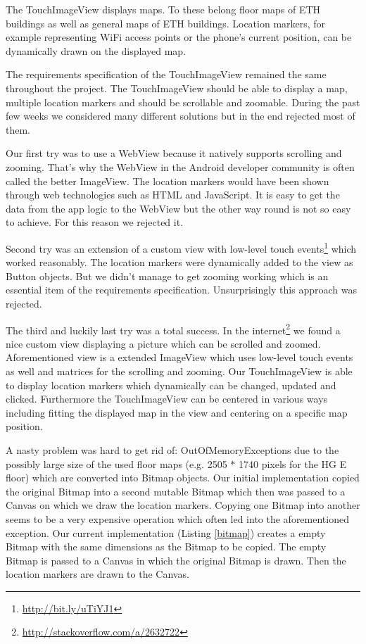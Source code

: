 The TouchImageView displays maps. To these belong floor maps of ETH buildings as well as general maps of ETH buildings. Location markers, for example representing WiFi access points or the phone's current position, can be dynamically drawn on the displayed map.

The requirements specification of the TouchImageView remained the same throughout the project. The TouchImageView should be able to display a map, multiple location markers and should be scrollable and zoomable. During the past few weeks we considered many different solutions but in the end rejected most of them.

Our first try was to use a WebView because it natively supports scrolling and zooming. That's why the WebView in the Android developer community is often called the better ImageView. The location markers would have been shown through web technologies such as HTML and JavaScript. It is easy to get the data from the app logic to the WebView but the other way round is not so easy to achieve. For this reason we rejected it. 

Second try was an extension of a custom view with low-level touch events\footnote{\url{http://bit.ly/uTiYJ1}} which worked reasonably. The location markers were dynamically added to the view as Button objects. But we didn't manage to get zooming working which is an essential item of the requirements specification. Unsurprisingly this approach was rejected.

The third and luckily last try was a total success. In the internet\footnote{\url{http://stackoverflow.com/a/2632722}} we found a nice custom view displaying a picture which can be scrolled and zoomed. Aforementioned view is a extended ImageView which uses low-level touch events as well and matrices for the scrolling and zooming. Our TouchImageView is able to display location markers which dynamically can be changed, updated and clicked. Furthermore the TouchImageView can be centered in various ways including fitting the displayed map in the view and centering on a specific map position.

A nasty problem was hard to get rid of: OutOfMemoryExceptions due to the possibly large size of the used floor maps (e.g. 2505 $*$ 1740 pixels for the HG E floor) which are converted into Bitmap objects. Our initial implementation copied the original Bitmap into a second mutable Bitmap which then was passed to a Canvas on which we draw the location markers. Copying one Bitmap into another seems to be a very expensive operation which often led into the aforementioned exception. Our current implementation (Listing \ref{bitmap}) creates a empty Bitmap with the same dimensions as the Bitmap to be copied. The empty Bitmap is passed to a Canvas in which the original Bitmap is drawn. Then the location markers are drawn to the Canvas.

